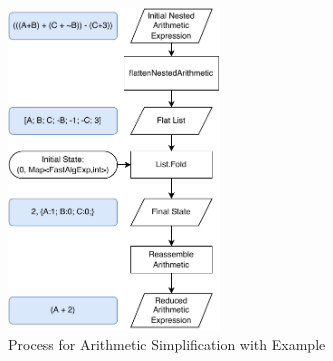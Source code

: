 \begin{figure}[h]
    \centering
    \includegraphics[width=0.5\textwidth]{05.ImpPlan/arithsimp.pdf}
    \caption{Process for Arithmetic Simplification with Example}
    \label{fig:arithsimp}
\end{figure}


